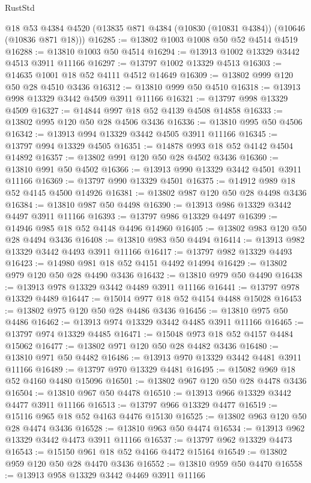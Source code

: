 \begin{lexlean}{RustStd}
\begin{coremodule}
    @18
    @53
    @4384
    @4520
    (@13835 @871 @4384 (@10830 (@10831 @4384)) (@10646 (@10836 @871 @18)))
@16285 := @13802 @1003 @1008 @50 @52 @4514 @4519
@16288 := @13810 @1003 @50 @4514
@16294 := @13913 @1002 @13329 @3442 @4513 @3911 @11166
@16297 := @13797 @1002 @13329 @4513
@16303 := @14635 @1001 @18 @52 @4111 @4512 @14649
@16309 := @13802 @999 @120 @50 @28 @4510 @3436
@16312 := @13810 @999 @50 @4510
@16318 := @13913 @998 @13329 @3442 @4509 @3911 @11166
@16321 := @13797 @998 @13329 @4509
@16327 := @14844 @997 @18 @52 @4139 @4508 @14858
@16333 := @13802 @995 @120 @50 @28 @4506 @3436
@16336 := @13810 @995 @50 @4506
@16342 := @13913 @994 @13329 @3442 @4505 @3911 @11166
@16345 := @13797 @994 @13329 @4505
@16351 := @14878 @993 @18 @52 @4142 @4504 @14892
@16357 := @13802 @991 @120 @50 @28 @4502 @3436
@16360 := @13810 @991 @50 @4502
@16366 := @13913 @990 @13329 @3442 @4501 @3911 @11166
@16369 := @13797 @990 @13329 @4501
@16375 := @14912 @989 @18 @52 @4145 @4500 @14926
@16381 := @13802 @987 @120 @50 @28 @4498 @3436
@16384 := @13810 @987 @50 @4498
@16390 := @13913 @986 @13329 @3442 @4497 @3911 @11166
@16393 := @13797 @986 @13329 @4497
@16399 := @14946 @985 @18 @52 @4148 @4496 @14960
@16405 := @13802 @983 @120 @50 @28 @4494 @3436
@16408 := @13810 @983 @50 @4494
@16414 := @13913 @982 @13329 @3442 @4493 @3911 @11166
@16417 := @13797 @982 @13329 @4493
@16423 := @14980 @981 @18 @52 @4151 @4492 @14994
@16429 := @13802 @979 @120 @50 @28 @4490 @3436
@16432 := @13810 @979 @50 @4490
@16438 := @13913 @978 @13329 @3442 @4489 @3911 @11166
@16441 := @13797 @978 @13329 @4489
@16447 := @15014 @977 @18 @52 @4154 @4488 @15028
@16453 := @13802 @975 @120 @50 @28 @4486 @3436
@16456 := @13810 @975 @50 @4486
@16462 := @13913 @974 @13329 @3442 @4485 @3911 @11166
@16465 := @13797 @974 @13329 @4485
@16471 := @15048 @973 @18 @52 @4157 @4484 @15062
@16477 := @13802 @971 @120 @50 @28 @4482 @3436
@16480 := @13810 @971 @50 @4482
@16486 := @13913 @970 @13329 @3442 @4481 @3911 @11166
@16489 := @13797 @970 @13329 @4481
@16495 := @15082 @969 @18 @52 @4160 @4480 @15096
@16501 := @13802 @967 @120 @50 @28 @4478 @3436
@16504 := @13810 @967 @50 @4478
@16510 := @13913 @966 @13329 @3442 @4477 @3911 @11166
@16513 := @13797 @966 @13329 @4477
@16519 := @15116 @965 @18 @52 @4163 @4476 @15130
@16525 := @13802 @963 @120 @50 @28 @4474 @3436
@16528 := @13810 @963 @50 @4474
@16534 := @13913 @962 @13329 @3442 @4473 @3911 @11166
@16537 := @13797 @962 @13329 @4473
@16543 := @15150 @961 @18 @52 @4166 @4472 @15164
@16549 := @13802 @959 @120 @50 @28 @4470 @3436
@16552 := @13810 @959 @50 @4470
@16558 := @13913 @958 @13329 @3442 @4469 @3911 @11166

\end{coremodule}
\end{lexlean}

